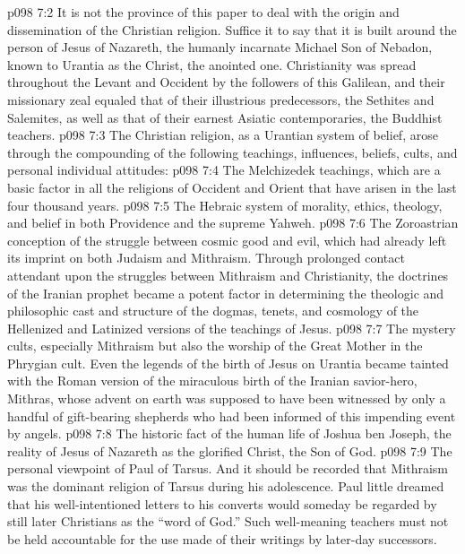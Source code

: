 \vs p098 7:2 It is not the province of this paper to deal with the origin and dissemination of the Christian religion. Suffice it to say that it is built around the person of Jesus of Nazareth, the humanly incarnate Michael Son of Nebadon, known to Urantia as the Christ, the anointed one. Christianity was spread throughout the Levant and Occident by the followers of this Galilean, and their missionary zeal equaled that of their illustrious predecessors, the Sethites and Salemites, as well as that of their earnest Asiatic contemporaries, the Buddhist teachers.\plusone
\vs p098 7:3 The Christian religion, as a Urantian system of belief, arose through the compounding of the following teachings, influences, beliefs, cults, and personal individual attitudes:
\pc \vs p098 7:4 \bibnobreakspace The Melchizedek teachings, which are a basic factor in all the religions of Occident and Orient that have arisen in the last four thousand years.
\pc \vs p098 7:5 \bibnobreakspace The Hebraic system of morality, ethics, theology, and belief in both Providence and the supreme Yahweh.
\pc \vs p098 7:6 \bibnobreakspace The Zoroastrian conception of the struggle between cosmic good and evil, which had already left its imprint on both Judaism and Mithraism. Through prolonged contact attendant upon the struggles between Mithraism and Christianity, the doctrines of the Iranian prophet became a potent factor in determining the theologic and philosophic cast and structure of the dogmas, tenets, and cosmology of the Hellenized and Latinized versions of the teachings of Jesus.
\pc \vs p098 7:7 \bibnobreakspace The mystery cults, especially Mithraism but also the worship of the Great Mother in the Phrygian cult. Even the legends of the birth of Jesus on Urantia became tainted with the Roman version of the miraculous birth of the Iranian savior\hyp{}hero, Mithras, whose advent on earth was supposed to have been witnessed by only a handful of gift\hyp{}bearing shepherds who had been informed of this impending event by angels.
\pc \vs p098 7:8 \bibnobreakspace The historic fact of the human life of Joshua ben Joseph, the reality of Jesus of Nazareth as the glorified Christ, the Son of God.
\pc \vs p098 7:9 \bibnobreakspace The personal viewpoint of Paul of Tarsus. And it should be recorded that Mithraism was the dominant religion of Tarsus during his adolescence. Paul little dreamed that his well\hyp{}intentioned letters to his converts would someday be regarded by still later Christians as the “word of God.” Such well\hyp{}meaning teachers must not be held accountable for the use made of their writings by later\hyp{}day successors.
